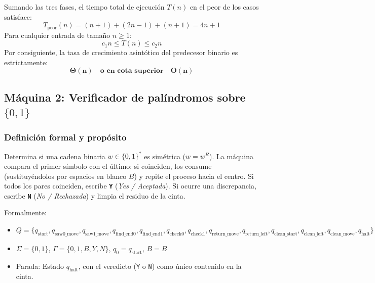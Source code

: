\documentclass[11pt,letterpaper]{article}
\begin{document}
Sumando las tres fases, el tiempo total de ejecución $T(n)$ en el peor de los casos satisface:
\begin{equation}
T_{\text{peor}}(n) = (n + 1) + (2n - 1) + (n + 1) = 4n + 1
\end{equation}
Para cualquier entrada de tamaño $n \ge 1$:
\begin{equation}
c_1 n \le T(n) \le c_2 n
\end{equation}
Por consiguiente, la tasa de crecimiento asintótico del predecesor binario es estrictamente:
\begin{equation}
\mathbf{\Theta(n) \quad \text{o en cota superior} \quad O(n)}
\end{equation}

\subsection{Máquina 2: Verificador de palíndromos sobre $\{0, 1\}$}

\subsubsection{Definición formal y propósito}
Determina si una cadena binaria $w \in \{0, 1\}^*$ es simétrica ($w = w^R$). La máquina compara el primer símbolo con el último; si coinciden, los consume (sustituyéndolos por espacios en blanco $B$) y repite el proceso hacia el centro. Si todos los pares coinciden, escribe \textbf{\texttt{Y}} (\textit{Yes / Aceptada}). Si ocurre una discrepancia, escribe \textbf{\texttt{N}} (\textit{No / Rechazada}) y limpia el residuo de la cinta.

Formalmente:
\begin{itemize}
    \item $Q = \{q_{\text{start}}, q_{\text{saw0\_move}}, q_{\text{saw1\_move}}, q_{\text{find\_end0}}, q_{\text{find\_end1}}, q_{\text{check0}}, q_{\text{check1}}, q_{\text{return\_move}}, q_{\text{return\_left}}, q_{\text{clean\_start}}, q_{\text{clean\_left}}, q_{\text{clean\_move}}, q_{\text{halt}}\}$
    \item $\Sigma = \{0, 1\}$, $\Gamma = \{0, 1, B, Y, N\}$, $q_0 = q_{\text{start}}$, $B = B$
    \item Parada: Estado $q_{\text{halt}}$, con el veredicto (\texttt{Y} o \texttt{N}) como único contenido en la cinta.
\end{itemize}
\end{document}
